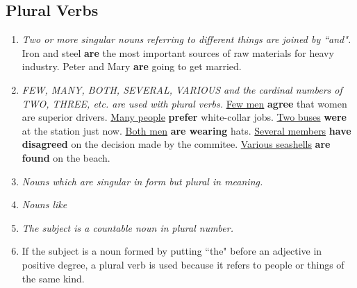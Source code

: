 \subsection{Plural Verbs}
\begin{enumerate}
    \item
        {\it
        Two or more singular nouns referring to different things are joined by
        ``and".
        }
        \newline
        \newline
        Iron and steel \textbf{are} the most important sources of raw materials
        for heavy industry.
        \newline
        \newline
        Peter and Mary \textbf{are} going to get married.
    \item
        {\it
        FEW, MANY, BOTH, SEVERAL, VARIOUS and the cardinal numbers of TWO,
        THREE, etc. are used with plural verbs.
        }
        \newline
        \newline
        \underline{Few men} \textbf{agree} that women are superior drivers.
        \newline
        \newline
        \underline{Many people} \textbf{prefer} white-collar jobs.
        \newline
        \newline
        \underline{Two buses} \textbf{were} at the station just now.
        \newline
        \newline
        \underline{Both men} \textbf{are wearing} hats.
        \newline
        \newline
        \underline{Several members} \textbf{have disagreed} on the decision made
        by the commitee.
        \newline
        \newline
        \underline{Various seashells} \textbf{are found} on the beach.
    \item
        {\it
        Nouns which are singular in form but plural in meaning.
        }
    \item
        {\it
        Nouns like
        }
    \item
        {\it
        The subject is a countable noun in plural number.
        }
    \item
        {If the subject is a noun formed by putting ``the" before an adjective
        in positive degree, a plural verb is used because it refers to people or
        things of the same kind.
        }
\end{enumerate}

